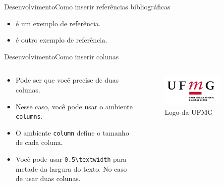 \documentclass[11pt]{beamer}
\begin{document}
            \begin{frame}{Desenvolvimento}{Como inserir referências bibliográficas}
                \begin{itemize}
                    \item \citet{moulin2022induction} é um exemplo de referência.
                    \item \citep{torres2020neurocognitive} é outro exemplo de referência.
                \end{itemize}
            \end{frame}

            \begin{frame}{Desenvolvimento}{Como inserir colunas}
                \begin{columns}
                    \begin{column}{0.5\textwidth}
                        \begin{itemize}
                            \item Pode ser que você precise de duas colunas.
                            \item Nesse caso, você pode usar o ambiente \texttt{columns}.
                            \item O ambiente \texttt{column} define o tamanho de cada coluna.
                            \item Você pode usar \texttt{0.5\textbackslash textwidth} para metade da largura do texto. No caso de usar duas colunas.
                        \end{itemize}
                    \end{column}
                    \begin{column}{0.5\textwidth}
                        \begin{figure}
                            \centering
                            \includegraphics[width=0.8\textwidth]{./figuras/ufmg}
                            \caption{Logo da UFMG}
                        \end{figure}
                    \end{column}
                \end{columns}
            \end{frame}
\end{document}

